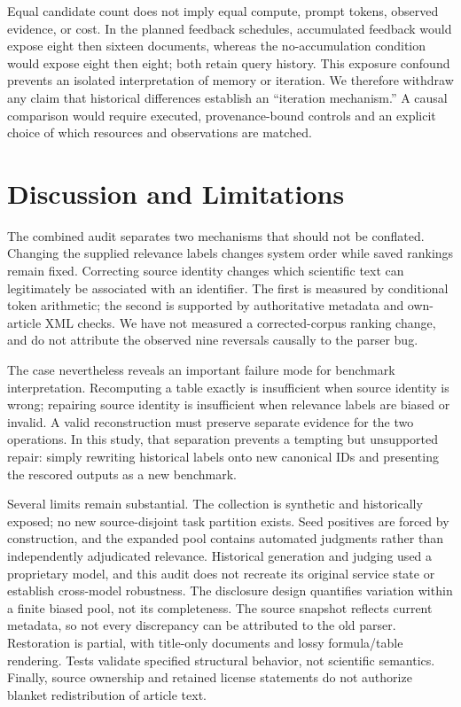 \documentclass{article}
\begin{document}
Equal candidate count does not imply equal compute, prompt tokens, observed evidence, or cost. In the planned feedback schedules, accumulated feedback would expose eight then sixteen documents, whereas the no-accumulation condition would expose eight then eight; both retain query history. This exposure confound prevents an isolated interpretation of memory or iteration. We therefore withdraw any claim that historical differences establish an ``iteration mechanism.'' A causal comparison would require executed, provenance-bound controls and an explicit choice of which resources and observations are matched.

\section{Discussion and Limitations}
The combined audit separates two mechanisms that should not be conflated. Changing the supplied relevance labels changes system order while saved rankings remain fixed. Correcting source identity changes which scientific text can legitimately be associated with an identifier. The first is measured by conditional token arithmetic; the second is supported by authoritative metadata and own-article XML checks. We have not measured a corrected-corpus ranking change, and do not attribute the observed nine reversals causally to the parser bug.

The case nevertheless reveals an important failure mode for benchmark interpretation. Recomputing a table exactly is insufficient when source identity is wrong; repairing source identity is insufficient when relevance labels are biased or invalid. A valid reconstruction must preserve separate evidence for the two operations. In this study, that separation prevents a tempting but unsupported repair: simply rewriting historical labels onto new canonical IDs and presenting the rescored outputs as a new benchmark.

Several limits remain substantial. The collection is synthetic and historically exposed; no new source-disjoint task partition exists. Seed positives are forced by construction, and the expanded pool contains automated judgments rather than independently adjudicated relevance. Historical generation and judging used a proprietary model, and this audit does not recreate its original service state or establish cross-model robustness. The disclosure design quantifies variation within a finite biased pool, not its completeness. The source snapshot reflects current metadata, so not every discrepancy can be attributed to the old parser. Restoration is partial, with title-only documents and lossy formula/table rendering. Tests validate specified structural behavior, not scientific semantics. Finally, source ownership and retained license statements do not authorize blanket redistribution of article text.
\end{document}
